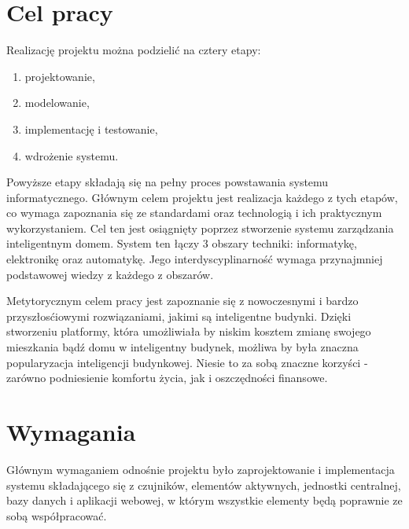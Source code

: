 \documentclass[eng,oneside]{mgr}
\begin{document}
\section{Cel pracy}
Realizację projektu można podzielić na cztery etapy:
\begin{enumerate}
	\item projektowanie,
	\item modelowanie,
	\item implementację i testowanie,
	\item wdrożenie systemu.
\end{enumerate}
Powyższe etapy składają się na pełny proces powstawania systemu informatycznego. Głównym celem projektu jest realizacja każdego z tych etapów, co wymaga zapoznania się ze standardami oraz technologią i ich praktycznym wykorzystaniem. Cel ten jest osiągnięty poprzez stworzenie systemu zarządzania inteligentnym domem. System ten łączy 3 obszary techniki: informatykę, elektronikę oraz automatykę. Jego interdyscyplinarność wymaga przynajmniej podstawowej wiedzy z każdego z obszarów.

Metytorycznym celem pracy jest zapoznanie się z nowoczesnymi i bardzo przyszłosćiowymi rozwiązaniami, jakimi są inteligentne budynki. Dzięki stworzeniu platformy, która umożliwiała by niskim kosztem zmianę swojego mieszkania bądź domu w inteligentny budynek, możliwa by była znaczna popularyzacja inteligencji budynkowej. Niesie to za sobą znaczne korzyści - zarówno podniesienie komfortu życia, jak i oszczędności finansowe.

\section{Wymagania}
Głównym wymaganiem odnośnie projektu było zaprojektowanie i implementacja systemu składającego się z czujników, elementów aktywnych, jednostki centralnej, bazy danych i aplikacji webowej, w którym wszystkie elementy będą poprawnie ze sobą współpracować.
\end{document}
